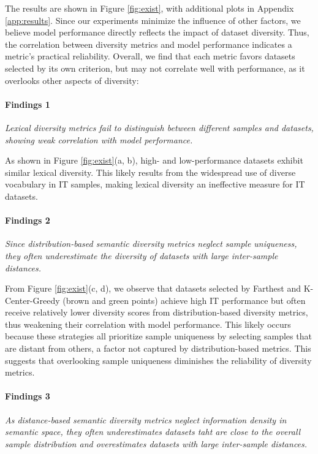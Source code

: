 The results are shown in Figure \ref{fig:exist}, with additional plots in Appendix \ref{app:results}. Since our experiments minimize the influence of other factors, we believe model performance directly reflects the impact of dataset diversity. Thus, the correlation between diversity metrics and model performance indicates a metric's practical reliability. Overall, we find that each metric favors datasets selected by its own criterion, but may not correlate well with performance, as it overlooks other aspects of diversity:

\paragraph{Findings 1}
\textit{Lexical diversity metrics fail to distinguish between different samples and datasets, showing weak correlation with model performance.}

As shown in Figure \ref{fig:exist}(a, b), high- and low-performance datasets exhibit similar lexical diversity. This likely results from the widespread use of diverse vocabulary in IT samples, making lexical diversity an ineffective measure for IT datasets.

\paragraph{Findings 2}
\textit{Since distribution-based semantic diversity metrics neglect sample uniqueness, they often underestimate the diversity of datasets with large inter-sample distances.}

From Figure \ref{fig:exist}(c, d), we observe that datasets selected by Farthest and K-Center-Greedy (brown and green points) achieve high IT performance but often receive relatively lower diversity scores from distribution-based diversity metrics, thus weakening their correlation with model performance. This likely occurs because these strategies all prioritize sample uniqueness by selecting samples that are distant from others, a factor not captured by distribution-based metrics. This suggests that overlooking sample uniqueness diminishes the reliability of diversity metrics.

\paragraph{Findings 3}
\textit{As distance-based semantic diversity metrics neglect information density in semantic space, they often underestimates datasets taht are close to the overall sample distribution and overestimates datasets with large inter-sample distances.}

